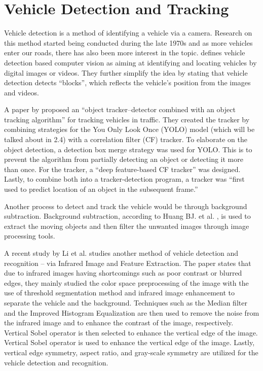 \section{Vehicle Detection and Tracking}

	Vehicle detection is a method of identifying a vehicle via a camera. Research on this method started being conducted during the late 1970s \cite{NathDeb2012} and as more vehicles enter our roads, there has also been more interest in the topic. \cite{Meng_2020} defines vehicle detection based computer vision as aiming at identifying and locating vehicles by digital images or videos. They further simplify the idea by stating that vehicle detection detects “blocks”, which reflects the vehicle’s position from the images and videos.

	A paper by \cite{yang_2020} proposed an “object tracker–detector combined with an object tracking algorithm” for tracking vehicles in traffic. They created the tracker by combining strategies for the You Only Look Once (YOLO) model (which will be talked about in 2.4) with a correlation filter (CF) tracker. To elaborate on the object detection, a detection box merge strategy was used for YOLO. This is to prevent the algorithm from partially detecting an object or detecting it more than once. For the tracker, a “deep feature-based CF tracker” was designed. Lastly, to combine both into a tracker-detection program, a tracker was “first used to predict location of an object in the subsequent frame.”

	Another process to detect and track the vehicle would be through background subtraction. Background subtraction, according to Huang BJ. et al. \citeyear{Huang_2017}, is used to extract the moving objects and then filter the unwanted images through image processing tools. 
	
	A recent study by Li et al. \citeyear{li_2022} studies another method of vehicle detection and recognition – via Infrared Image and Feature Extraction. The paper states that due to infrared images having shortcomings such as poor contrast or blurred edges, they mainly studied the color space preprocessing of the image with the use of threshold segmentation method and infrared image enhancement to separate the vehicle and the background. Techniques such as the Median filter and the Improved Histogram Equalization are then used to remove the noise from the infrared image and to enhance the contrast of the image, respectively. Vertical Sobel operator is then selected to enhance the vertical edge of the image. Vertical Sobel operator is used to enhance the vertical edge of the image. Lastly, vertical edge symmetry, aspect ratio, and gray-scale symmetry are utilized for the vehicle detection and recognition.


